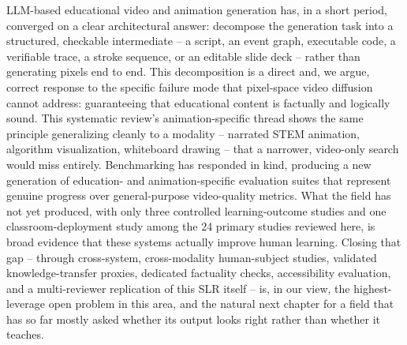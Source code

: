 \documentclass[journal]{IEEEtran}
\begin{document}
LLM-based educational video and animation generation has, in a short period, converged on a clear architectural answer: decompose the generation task into a structured, checkable intermediate -- a script, an event graph, executable code, a verifiable trace, a stroke sequence, or an editable slide deck -- rather than generating pixels end to end. This decomposition is a direct and, we argue, correct response to the specific failure mode that pixel-space video diffusion cannot address: guaranteeing that educational content is factually and logically sound. This systematic review's animation-specific thread shows the same principle generalizing cleanly to a modality -- narrated STEM animation, algorithm visualization, whiteboard drawing -- that a narrower, video-only search would miss entirely. Benchmarking has responded in kind, producing a new generation of education- and animation-specific evaluation suites that represent genuine progress over general-purpose video-quality metrics. What the field has not yet produced, with only three controlled learning-outcome studies and one classroom-deployment study among the 24 primary studies reviewed here, is broad evidence that these systems actually improve human learning. Closing that gap -- through cross-system, cross-modality human-subject studies, validated knowledge-transfer proxies, dedicated factuality checks, accessibility evaluation, and a multi-reviewer replication of this SLR itself -- is, in our view, the highest-leverage open problem in this area, and the natural next chapter for a field that has so far mostly asked whether its output looks right rather than whether it teaches.



\end{document}
